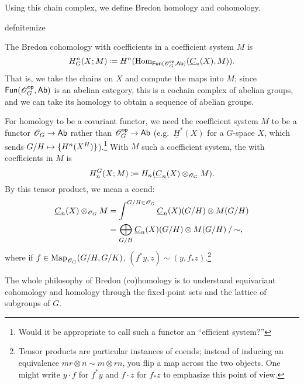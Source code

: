 Using this chain complex, we define Bredon homology and cohomology.
\begin{comp}{defn}{itemize}
	\item The Bredon cohomology with coefficients in a coefficient system $M$ is
	\[H_G^n(X;M) \coloneqq H^n(\operatorname{Hom}_{\mathsf{Fun}(\mathscr O_G^{\mathsf{op}}, \mathsf{Ab})}(\underline C_*(X), M)).\]
	That is, we take the chains on $X$ and compute the maps into $M$; since $\mathsf{Fun}(\mathscr O_G^{\mathsf{op}},\mathsf{Ab})$ is an abelian
	category, this is a cochain complex of abelian groups, and we can take its homology to obtain a sequence of
	abelian groups.
	\item For homology to be a covariant functor, we need the coefficient system $M$ to be a functor $\mathscr O_G\to\mathsf{Ab}$
	rather than $\mathscr O_G^{\mathsf{op}}\to\mathsf{Ab}$ (e.g.\ $\underline H^*(X)$ for a $G$-space $X$, which sends
	$G/H\mapsto\set{H^n(X^H)}$).\footnote{Would it be appropriate to call such a functor an ``efficient system?''}
	With $M$ such a coefficient system, the  with coefficients in $M$ is
	\[H_n^G(X; M) \coloneqq H_n(\underline C_n(X)\otimes_{\mathscr O_G} M).\]
	By this tensor product, we mean a coend:
	\begin{align*}
	\underline C_n(X)\otimes_{\mathscr O_G} M &= \int^{G/H\in \mathscr O_G} \underline C_n(X)(G/H)\otimes M(G/H)\\
	&= \bigoplus_{G/H} {\underline C_n(X)(G/H)\otimes M(G/H)} \mathbin/ {\mathord\sim},
	\end{align*}
	where if $f\in\operatorname{Map}_{\mathscr O_G}(G/H, G/K)$, $(f^*y, z)\sim (y, f_*z)$.\footnote{Tensor products are particular
	instances of coends; instead of inducing an equivalence $mr\otimes n\sim m\otimes rn$, you flip a map across
	the two objects. One might write $y\cdot f$ for $f^* y$ and $f\cdot z$ for $f_* z$ to emphasize this point of
	view.}
\end{comp}
The whole philosophy of Bredon (co)homology is to understand equivariant cohomology and homology through the
fixed-point sets and the lattice of subgroups of $G$.


